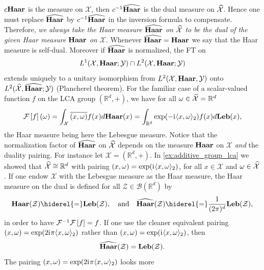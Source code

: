 $c\mathbf{Haar}$ is the measure on $\mathcal{X}$, then $c^{-1}\widehat{\mathbf{Haar}}$ is the dual
measure on $\widehat{\mathcal{X}}$. Hence one must replace $\widehat{\mathbf{Haar}}$ by
$c^{-1}\widehat{\mathbf{Haar}}$ in the inversion formula to compensate. Therefore,
\emph{we always take the Haar measure $\widehat{\mathbf{Haar}}$ on $\widehat{\mathcal{X}}$ to
be the dual of the given Haar measure $\mathbf{Haar}$ on $\mathcal{X}$}. Whenever
$\widehat{\mathbf{Haar}}=\mathbf{Haar}$ we say that the Haar measure is self-dual. Moreover if
$\widehat{\mathbf{Haar}}$ is normalized, the \acl{FT} on
\begin{dmath*}
    L^1(\mathcal{X},\Haar;\mathcal{Y})\cap L^2(\mathcal{X},\Haar;\mathcal{Y})
\end{dmath*}
extends uniquely to a unitary isomorphism from $L^2(\mathcal{X}, \mathbf{Haar},
\mathcal{Y})$ onto $L^2(\widehat{\mathcal{X}}, \widehat{\mathbf{Haar}}; \mathcal{Y})$
(Plancherel theorem). For the familiar case of a scalar-valued function $f$ on
the \ac{LCA} group $(\mathbb{R}^d, +)$, we have for all $\omega\in
\widehat{\mathcal{X}}=\mathbb{R}^d$
\begin{dmath}
    \label{fourier-R-plus}
    \FT{f}(\omega)
    =\int_{\mathcal{X}} \conj{\pairing{x,\omega}}f(x)d\Haar(x)
    =\int_{\mathbb{R}^d} \exp(-\iu \inner{x,\omega}_2)f(x) d\Leb(x),
\end{dmath}
the Haar measure being here the Lebesgue measure. Notice that the normalization
factor of $\widehat{\mathbf{Haar}}$ on $\widehat{\mathcal{X}}$ depends on the measure $\mathbf{Haar}$
on $\mathcal{X}$ \emph{and} the duality pairing. For instance let
$\mathcal{X}=(\mathbb{R}^d, +)$. In \cref{ex:additive_group_lca} we showed that
$\widehat{\mathcal{X}}\cong\mathbb{R}^d$ with pairing
$(x,\omega)=\exp({\mathrm{i}\mkern1mu}\langle x,\omega\rangle_2)$, for all $x\in\mathcal{X}$
and $\omega\in\widehat{\mathcal{X}}$.  If one endow $\mathcal{X}$ with the
Lebesgue measure as the Haar measure, the Haar measure on the dual is defined
for all $\mathcal{Z}\in\mathcal{B}(\mathbb{R}^d)$ by
\begin{dmath*}
    \Haar(\mathcal{Z})\hiderel{=}\Leb(\mathcal{Z}),
    \quad\text{and}\quad
    \dual{\Haar}(\mathcal{Z})\hiderel{=}\frac{1}{(2\pi)^d}\Leb(\mathcal{Z}),
\end{dmath*}
in order to have $\mathcal{F}^{-1}\mathcal{F}\left[f\right]=f$. If one use the cleaner equivalent
pairing $(x,\omega)=\exp(2{\mathrm{i}\mkern1mu}\pi \langle x, \omega\rangle_2)$ rather than
$(x,\omega)=\exp({\mathrm{i}\mkern1mu} \langle x,\omega\rangle_2)$, then
\begin{dmath*}
    \dual{\Haar}(\mathcal{Z})=\Leb(\mathcal{Z}).
\end{dmath*}
The pairing $(x,\omega)=\exp(2{\mathrm{i}\mkern1mu}\pi \langle x,\omega\rangle_2)$ looks more
